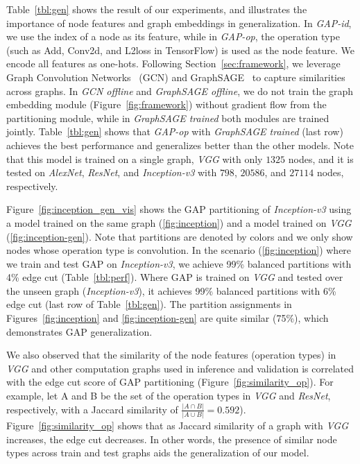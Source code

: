 \documentclass[10pt,twocolumn]{article}
\begin{document}
Table~\ref{tbl:gen} shows the result of our experiments, and illustrates the importance of node features and graph embeddings in generalization. In \textit{GAP-id}, we use the index of a node as its feature, while in \textit{GAP-op}, the operation type (such as Add, Conv2d, and L2loss in TensorFlow) is used as the node feature. We encode all features as one-hots. Following Section~\ref{sec:framework}, we leverage Graph Convolution Networks~\cite{kipf2017semi} (GCN) and GraphSAGE~\cite{HamiltonYL17} to capture similarities across graphs. In \textit{GCN offline} and \textit{GraphSAGE offline}, we do not train the graph embedding module (Figure~\ref{fig:framework}) without gradient flow from the partitioning module, while in \textit{GraphSAGE trained} both modules are trained jointly. 
Table~\ref{tbl:gen} shows that \textit{GAP-op} with \textit{GraphSAGE trained} (last row) achieves the best performance and generalizes better than the other models. Note that this model is trained on a single graph, \textit{VGG} with only $1325$ nodes, and it is tested on \textit{AlexNet}, \textit{ResNet}, and \textit{Inception-v3} with $798$, $20586$, and $27114$ nodes, respectively. 

Figure~\ref{fig:inception_gen_vis} shows the GAP partitioning of \textit{Inception-v3} using a model trained on the same graph (\ref{fig:inception}) and a model trained on \textit{VGG} (\ref{fig:inception-gen}). Note that partitions are denoted by colors and we only show nodes whose operation type is convolution. In the scenario (\ref{fig:inception}) where we train and test GAP on \textit{Inception-v3}, we achieve 99\% balanced partitions with 4\% edge cut (Table~\ref{tbl:perf}). Where GAP is trained on \textit{VGG} and tested over the unseen graph (\textit{Inception-v3}), it achieves 99\% balanced partitions with 6\% edge cut (last row of Table~\ref{tbl:gen}). The partition assignments in Figures~\ref{fig:inception} and \ref{fig:inception-gen} are quite similar (75\%), which demonstrates GAP generalization.

We also observed that the similarity of the node features (operation types) in \textit{VGG} and other computation graphs used in inference and validation is correlated with the edge cut score of GAP partitioning (Figure~\ref{fig:similarity_op}). 
For example, let A and B be the set of the operation types in \textit{VGG} and \textit{ResNet}, respectively, with a Jaccard similarity of $\frac{|A \cap B|}{|A \cup B|} = 0.592$). Figure~\ref{fig:similarity_op} shows that as Jaccard similarity of a graph with \textit{VGG} increases, the edge cut decreases. In other words, the presence of similar node types across train and test graphs aids the generalization of our model.
\end{document}
